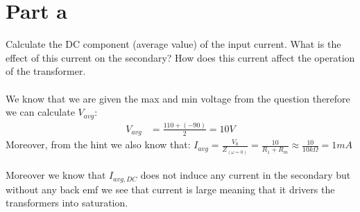 \documentclass{article}
\begin{document}
\section*{Part a}
Calculate the DC component (average value) of the input current. What is the effect of this current on the secondary? How does this current affect the operation of the transformer.\\
\\We know that we are given the max and min voltage from the question therefore we can calculate $V_{avg}$:
\begin{align*}
    V_{avg} &= \frac{110 + (-90)}{2} = 10V
\end{align*}
Moreover, from the hint we also know that: $I_{avg} = \frac{V_0}{Z_{(\omega = 0)}} = \frac{10}{R_1 + R_m} \approx  \frac{10}{10k\Omega} = 1mA$ \\
\\
Moreover we know that $I_{avg,DC}$ does not induce any current in the secondary but without any back emf we see that current is large meaning that it drivers the transformers into saturation.
\end{document}
